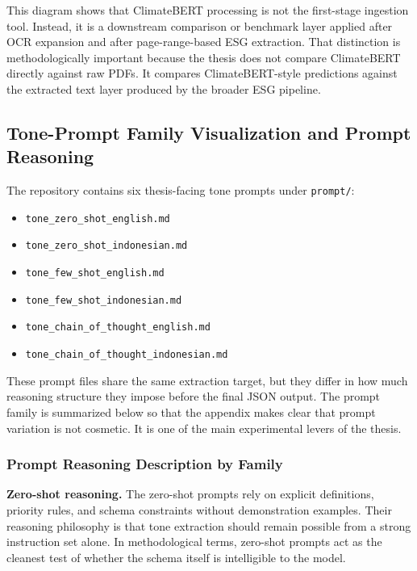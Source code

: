 \documentclass[english, online, cse, master]{dithesis}
\providecommand{\tightlist}{\setlength{\itemsep}{0pt}\setlength{\parskip}{0pt}}
\begin{document}
This diagram shows that ClimateBERT processing is not the first-stage ingestion tool. Instead, it is a downstream comparison or benchmark layer applied after OCR expansion and after page-range-based ESG extraction. That distinction is methodologically important because the thesis does not compare ClimateBERT directly against raw PDFs. It compares ClimateBERT-style predictions against the extracted text layer produced by the broader ESG pipeline.

\subsection{Tone-Prompt Family Visualization and Prompt Reasoning}\label{tone-prompt-family-visualization-and-prompt-reasoning}

The repository contains six thesis-facing tone prompts under \texttt{prompt/}:

\begin{itemize}
\tightlist
\item
  \texttt{tone\_zero\_shot\_english.md}
\item
  \texttt{tone\_zero\_shot\_indonesian.md}
\item
  \texttt{tone\_few\_shot\_english.md}
\item
  \texttt{tone\_few\_shot\_indonesian.md}
\item
  \texttt{tone\_chain\_of\_thought\_english.md}
\item
  \texttt{tone\_chain\_of\_thought\_indonesian.md}
\end{itemize}

These prompt files share the same extraction target, but they differ in how much reasoning structure they impose before the final JSON output. The prompt family is summarized below so that the appendix makes clear that prompt variation is not cosmetic. It is one of the main experimental levers of the thesis.

\subsubsection{Prompt Reasoning Description by Family}\label{prompt-reasoning-description-by-family}

\textbf{Zero-shot reasoning.} The zero-shot prompts rely on explicit definitions, priority rules, and schema constraints without demonstration examples. Their reasoning philosophy is that tone extraction should remain possible from a strong instruction set alone. In methodological terms, zero-shot prompts act as the cleanest test of whether the schema itself is intelligible to the model.
\end{document}
